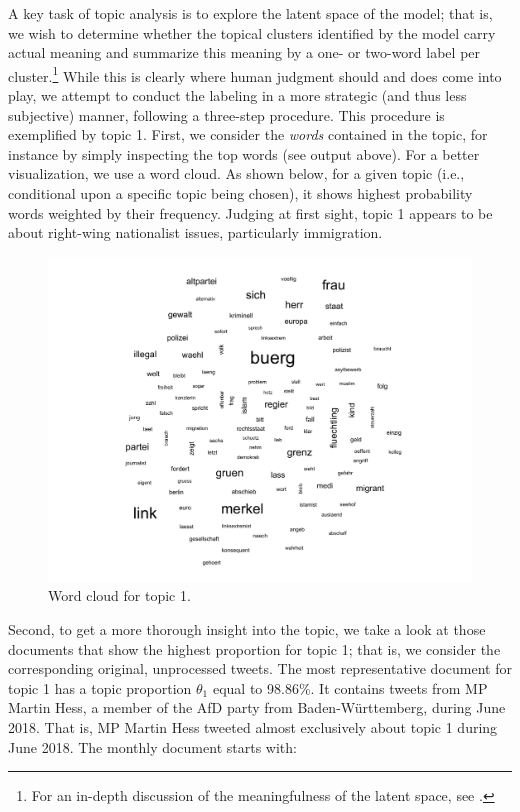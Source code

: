 A key task of topic analysis is to explore the latent space of the model; that is, we wish to determine whether the topical clusters identified by the model carry actual meaning and summarize this meaning by a one- or two-word label per cluster.\footnote{For an in-depth discussion of the meaningfulness of the latent space, see \cite{chang2009reading}.} While this is clearly where human judgment should and does come into play, we attempt to conduct the labeling in a more strategic (and thus less subjective) manner, following a three-step procedure. This procedure is exemplified by topic 1. First, we consider the \textit{words} contained in the topic, for instance by simply inspecting the top words (see output above). For a better visualization, we use a word cloud. As shown below, for a given topic (i.e., conditional upon a specific topic being chosen), it shows highest probability words weighted by their frequency. Judging at first sight, topic 1 appears to be about right-wing nationalist issues, particularly immigration.

\begin{figure}[h!]
  \centering
  \captionsetup{justification=centering,margin=2cm}
  \includegraphics[scale = 0.5]{../plots/4_2/t1_wordcloud.pdf}
  \caption{Word cloud for topic 1.}
  \label{fig:t1_wordcloud}
\end{figure}

Second, to get a more thorough insight into the topic, we take a look at those documents that show the highest proportion for topic 1; that is, we consider the corresponding original, unprocessed tweets. The most representative document for topic 1 has a topic proportion $\theta_1$ equal to 98.86\%. It contains tweets from MP Martin Hess, a member of the AfD party from Baden-Württemberg, during June 2018. That is, MP Martin Hess tweeted almost exclusively about topic 1 during June 2018. The monthly document starts with:

